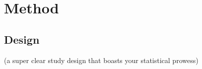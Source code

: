 \section{Method}

\subsection{Design}

(a super clear study design that boasts your statistical prowess)